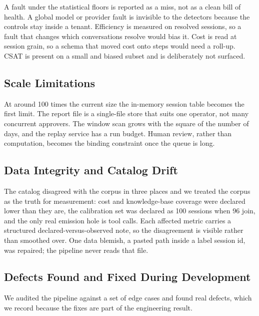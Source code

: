 \documentclass[8pt,twocolumn,a4paper]{extarticle}
\begin{document}
A fault under the statistical floors is reported as a miss, not as a
clean bill of health. A global model or provider fault is invisible to
the detectors because the controls stay inside a tenant. Efficiency is
measured on resolved sessions, so a fault that changes which
conversations resolve would bias it. Cost is read at session grain, so a
schema that moved cost onto steps would need a roll-up. CSAT is present
on a small and biased subset and is deliberately not surfaced.

\subsection{Scale Limitations}

At around 100 times the current size the in-memory session table becomes
the first limit. The report file is a single-file store that suits one
operator, not many concurrent approvers. The window scan grows with the
square of the number of days, and the replay service has a run budget.
Human review, rather than computation, becomes the binding constraint
once the queue is long.

\subsection{Data Integrity and Catalog Drift}

The catalog disagreed with the corpus in three places and we treated the
corpus as the truth for measurement: cost and knowledge-base coverage
were declared lower than they are, the calibration set was declared as
100 sessions when 96 join, and the only real emission hole is tool
calls. Each affected metric carries a structured declared-versus-observed
note, so the disagreement is visible rather than smoothed over. One data
blemish, a pasted path inside a label session id, was repaired; the
pipeline never reads that file.

\subsection{Defects Found and Fixed During Development}

We audited the pipeline against a set of edge cases and found real
defects, which we record because the fixes are part of the engineering
result.
\end{document}
